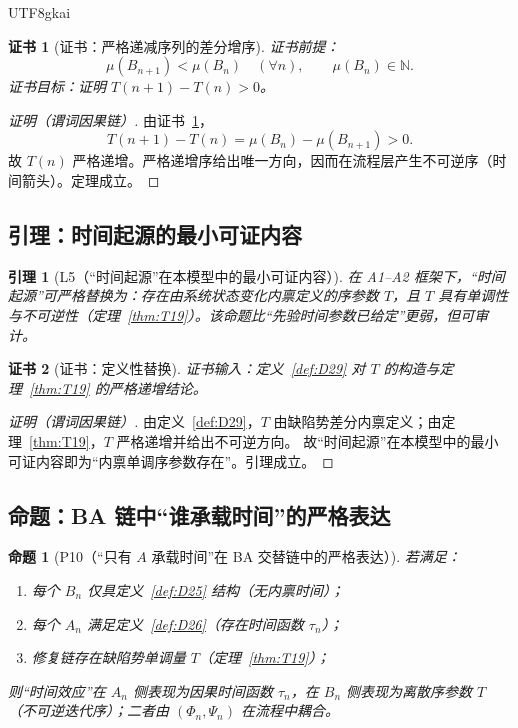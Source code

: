 \documentclass[12pt]{article}
\newtheorem{proposition}{命题}[section]
\newtheorem{lemma}{引理}[section]
\newtheorem{Certificate}{证书}[section]
\begin{document}
\begin{CJK*}{UTF8}{gkai}
\begin{Certificate}[证书：严格递减序列的差分增序]
\label{cert:T19}
证书前提：
\[
\mu(B_{n+1})<\mu(B_n)\quad(\forall n),\qquad \mu(B_n)\in\mathbb N.
\]
证书目标：证明 $T(n+1)-T(n)>0$。
\end{Certificate}

\begin{proof}[证明（谓词因果链）]
由证书~\ref{cert:T19}，
\[
T(n+1)-T(n)=\mu(B_n)-\mu(B_{n+1})>0.
\]
故 $T(n)$ 严格递增。严格递增序给出唯一方向，因而在流程层产生不可逆序（时间箭头）。定理成立。
\end{proof}

\subsection{引理：时间起源的最小可证内容}

\begin{lemma}[L5（“时间起源”在本模型中的最小可证内容）]
\label{lem:L5}
在 A1--A2 框架下，“时间起源”可严格替换为：存在由系统状态变化内禀定义的序参数 $T$，且 $T$ 具有单调性与不可逆性（定理~\ref{thm:T19}）。该命题比“先验时间参数已给定”更弱，但可审计。
\end{lemma}

\begin{Certificate}[证书：定义性替换]
\label{cert:L5}
证书输入：定义~\ref{def:D29} 对 $T$ 的构造与定理~\ref{thm:T19} 的严格递增结论。
\end{Certificate}

\begin{proof}[证明（谓词因果链）]
由定义~\ref{def:D29}，$T$ 由缺陷势差分内禀定义；由定理~\ref{thm:T19}，$T$ 严格递增并给出不可逆方向。
故“时间起源”在本模型中的最小可证内容即为“内禀单调序参数存在”。引理成立。
\end{proof}

\subsection{命题：BA 链中“谁承载时间”的严格表达}

\begin{proposition}[P10（“只有 $A$ 承载时间”在 BA 交替链中的严格表达）]
\label{prop:P10}
若满足：
\begin{enumerate}
\item 每个 $B_n$ 仅具定义~\ref{def:D25} 结构（无内禀时间）；
\item 每个 $A_n$ 满足定义~\ref{def:D26}（存在时间函数 $\tau_n$）；
\item 修复链存在缺陷势单调量 $T$（定理~\ref{thm:T19}）；
\end{enumerate}
则“时间效应”在 $A_n$ 侧表现为因果时间函数 $\tau_n$，在 $B_n$ 侧表现为离散序参数 $T$（不可逆迭代序）；二者由 $(\Phi_n,\Psi_n)$ 在流程中耦合。
\end{proposition}


\end{CJK*}
\end{document}
